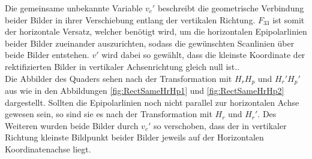 Die gemeinsame unbekannte Variable $v_c'$ beschreibt die geometrische Verbindung beider Bilder in ihrer Verschiebung entlang der vertikalen Richtung\cite{ZZ}. $F_ {33}$ ist somit der horizontale Versatz, welcher benötigt wird, um die horizontalen Epipolarlinien beider Bilder zueinander auszurichten, sodass die gewünschten Scanlinien über beide Bilder entstehen. $v'$ wird dabei so gewählt, dass die kleinste Koordinate der rektifizierten Bilder in vertikaler Achsenrichtung gleich null ist.\cite{ZZ}.\\


%

Die Abbilder des Quaders sehen nach der Transformation mit $H_rH_p$ und $H_r'H_p'$ aus wie in den Abbildungen \ref{fig:RectSameHrHp1} und \ref{fig:RectSameHrHp2} dargestellt. Sollten die Epipolarlinien noch nicht parallel zur horizontalen Achse gewesen sein, so sind sie es nach der Transformation mit $H_r$ und $H_r'$. Des Weiteren wurden beide Bilder durch $v_c'$ so verschoben, dass der in vertikaler Richtung kleinste Bildpunkt beider Bilder jeweils auf der Horizontalen Koordinatenachse liegt. 


